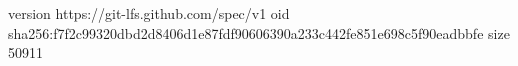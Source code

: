 version https://git-lfs.github.com/spec/v1
oid sha256:f7f2c99320dbd2d8406d1e87fdf90606390a233c442fe851e698c5f90eadbbfe
size 50911

